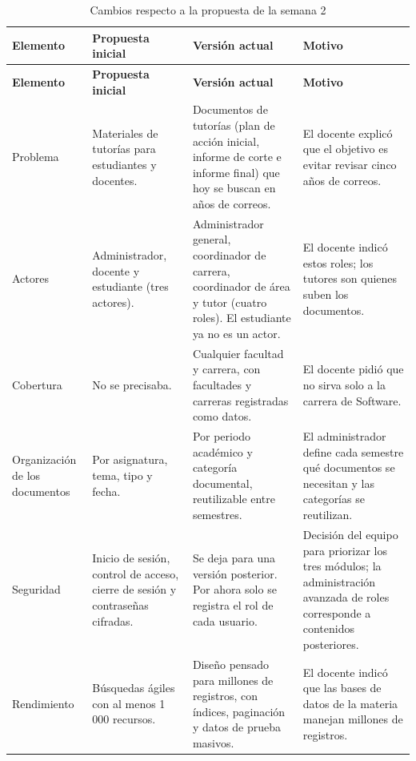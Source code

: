 \begingroup\small
\begin{longtable}{>{\raggedright\arraybackslash}p{2.3cm}>{\raggedright\arraybackslash}p{3.6cm}>{\raggedright\arraybackslash}p{4.3cm}>{\raggedright\arraybackslash}p{3.9cm}}
\caption{Cambios respecto a la propuesta de la semana 2}\label{tab:cambios}\\
\toprule
\textbf{Elemento} & \textbf{Propuesta inicial} & \textbf{Versión actual} & \textbf{Motivo} \\
\midrule
\endfirsthead
\toprule
\textbf{Elemento} & \textbf{Propuesta inicial} & \textbf{Versión actual} & \textbf{Motivo} \\
\midrule
\endhead
Problema &
Materiales de tutorías para estudiantes y docentes. &
Documentos de tutorías (plan de acción inicial, informe de corte e informe final)
que hoy se buscan en años de correos. &
El docente explicó que el objetivo es evitar revisar cinco años de correos. \\
\addlinespace
Actores &
Administrador, docente y estudiante (tres actores). &
Administrador general, coordinador de carrera, coordinador de área y tutor (cuatro
roles). El estudiante ya no es un actor. &
El docente indicó estos roles; los tutores son quienes suben los documentos. \\
\addlinespace
Cobertura &
No se precisaba. &
Cualquier facultad y carrera, con facultades y carreras registradas como datos. &
El docente pidió que no sirva solo a la carrera de Software. \\
\addlinespace
Organización de los documentos &
Por asignatura, tema, tipo y fecha. &
Por periodo académico y categoría documental, reutilizable entre semestres. &
El administrador define cada semestre qué documentos se necesitan y las categorías
se reutilizan. \\
\addlinespace
Seguridad &
Inicio de sesión, control de acceso, cierre de sesión y contraseñas cifradas. &
Se deja para una versión posterior. Por ahora solo se registra el rol de cada usuario. &
Decisión del equipo para priorizar los tres módulos; la administración avanzada de
roles corresponde a contenidos posteriores. \\
\addlinespace
Rendimiento &
Búsquedas ágiles con al menos 1\,000 recursos. &
Diseño pensado para millones de registros, con índices, paginación y datos de prueba
masivos. &
El docente indicó que las bases de datos de la materia manejan millones de registros. \\
\bottomrule
\end{longtable}
\endgroup
